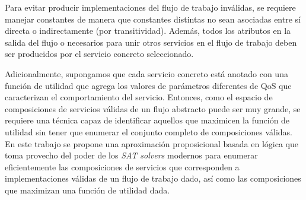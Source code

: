 Para evitar producir implementaciones del flujo de trabajo inválidas, se
requiere manejar constantes de manera que constantes distintas no sean asociadas
entre sí directa o indirectamente (por transitividad). Además, todos los
atributos en la salida del flujo o necesarios para unir otros servicios en el
flujo de trabajo deben ser producidos por el servicio concreto seleccionado.

Adicionalmente, supongamos que cada servicio concreto está anotado con una
función de utilidad que agrega los valores de parámetros diferentes de QoS que
caracterizan el comportamiento del servicio. Entonces, como el espacio de
composiciones de servicios válidas de un flujo abstracto puede ser muy grande,
se requiere una técnica capaz de identificar aquellos que maximicen la función
de utilidad sin tener que enumerar el conjunto completo de composiciones
válidas. En este trabajo se propone una aproximación proposicional basada en
lógica que toma provecho del poder de los \emph{SAT solvers} modernos para
enumerar eficientemente las composiciones de servicios que corresponden a
implementaciones válidas de un flujo de trabajo dado, así como las composiciones
que maximizan una función de utilidad dada.

